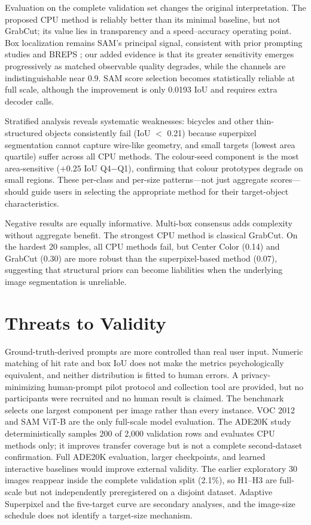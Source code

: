 Evaluation on the complete validation set changes the original interpretation. The proposed CPU method is reliably better than its minimal baseline, but not GrabCut; its value lies in transparency and a speed--accuracy operating point. Box localization remains SAM's principal signal, consistent with prior prompting studies \cite{gaus} and BREPS \cite{breps}; our added evidence is that its greater sensitivity emerges progressively as matched observable quality degrades, while the channels are indistinguishable near 0.9. SAM score selection becomes statistically reliable at full scale, although the improvement is only 0.0193 IoU and requires extra decoder calls.

Stratified analysis reveals systematic weaknesses: bicycles and other thin-structured objects consistently fail (IoU $<$ 0.21) because superpixel segmentation cannot capture wire-like geometry, and small targets (lowest area quartile) suffer across all CPU methods. The colour-seed component is the most area-sensitive ($+0.25$ IoU Q4$-$Q1), confirming that colour prototypes degrade on small regions. These per-class and per-size patterns---not just aggregate scores---should guide users in selecting the appropriate method for their target-object characteristics.

Negative results are equally informative. Multi-box consensus adds complexity without aggregate benefit. The strongest CPU method is classical GrabCut. On the hardest 20 samples, all CPU methods fail, but Center Color (0.14) and GrabCut (0.30) are more robust than the superpixel-based method (0.07), suggesting that structural priors can become liabilities when the underlying image segmentation is unreliable.

\section{Threats to Validity}

Ground-truth-derived prompts are more controlled than real user input. Numeric matching of hit rate and box IoU does not make the metrics psychologically equivalent, and neither distribution is fitted to human errors. A privacy-minimizing human-prompt pilot protocol and collection tool are provided, but no participants were recruited and no human result is claimed. The benchmark selects one largest component per image rather than every instance. VOC 2012 and SAM ViT-B are the only full-scale model evaluation. The ADE20K study deterministically samples 200 of 2,000 validation rows and evaluates CPU methods only; it improves transfer coverage but is not a complete second-dataset confirmation. Full ADE20K evaluation, larger checkpoints, and learned interactive baselines would improve external validity. The earlier exploratory 30 images reappear inside the complete validation split (2.1\%), so H1--H3 are full-scale but not independently preregistered on a disjoint dataset. Adaptive Superpixel and the five-target curve are secondary analyses, and the image-size schedule does not identify a target-size mechanism.

